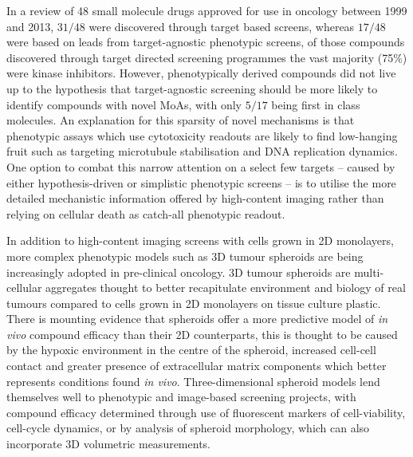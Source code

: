 \documentclass[a4paper,11pt,twoside,openright]{scrbook}
\begin{document}
In a review of 48 small molecule drugs approved for use in oncology between 1999 and 2013, $31/48$ were discovered through target based screens, whereas $17/48$ were based on leads from target-agnostic phenotypic screens, \cite{Moffat2014} of those compounds discovered through target directed screening programmes the vast majority (75\%) were kinase inhibitors.
However, phenotypically derived compounds did not live up to the hypothesis that target-agnostic screening should be more likely to identify compounds with novel MoAs, \cite{Swinney2011} with only $5/17$ being first in class molecules.
An explanation for this sparsity of novel mechanisms is that phenotypic assays which use cytotoxicity readouts are likely to find low-hanging fruit such as targeting microtubule stabilisation and DNA replication dynamics. \cite{Moffat2014}
One option to combat this narrow attention on a select few targets -- caused by either hypothesis-driven or simplistic phenotypic screens -- is to utilise the more detailed mechanistic information offered by high-content imaging rather than relying on cellular death as catch-all phenotypic readout.

In addition to high-content imaging screens with cells grown in 2D monolayers, more complex phenotypic models such as 3D tumour spheroids are being increasingly adopted in pre-clinical oncology.
3D tumour spheroids are multi-cellular aggregates thought to better recapitulate environment and biology of real tumours compared to cells grown in 2D monolayers on tissue culture plastic.
There is mounting evidence that spheroids offer a more predictive model of \textit{in vivo} compound efficacy than their 2D counterparts, \cite{Pickl2009, Breslin2013,Lovitt2013} this is thought to be caused by the hypoxic environment in the centre of the spheroid, increased cell-cell contact and greater presence of extracellular matrix components which better represents conditions found \textit{in vivo}.
Three-dimensional spheroid models lend themselves well to phenotypic and image-based screening projects, with compound efficacy determined through use of fluorescent markers of cell-viability, \cite{Lovitt2013} cell-cycle dynamics, \cite{Laurent2013} or by analysis of spheroid morphology, which can also incorporate 3D volumetric measurements. \cite{Huang2017}
\end{document}
